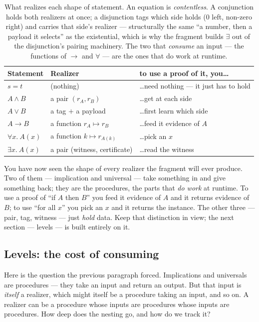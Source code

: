 \documentclass[11pt]{article}
\begin{document}
\begin{table}[h]
\centering
\renewcommand{\arraystretch}{1.35}
\begin{tabular}{@{}l l l@{}}
\toprule
\textbf{Statement} & \textbf{Realizer} & \textbf{to use a proof of it, you\dots} \\
\midrule
$s = t$ & (nothing) & \dots{}need nothing --- it just has to hold \\
$A \land B$ & a pair $(r_A, r_B)$ & \dots{}get at each side \\
$A \lor B$ & a tag $+$ a payload & \dots{}first learn which side \\
$A \rightarrow B$ & a function $r_A \mapsto r_B$ & \dots{}feed it evidence of $A$ \\
$\forall x.\ A(x)$ & a function $k \mapsto r_{A(k)}$ & \dots{}pick an $x$ \\
$\exists x.\ A(x)$ & a pair (witness, certificate) & \dots{}read the witness \\
\bottomrule
\end{tabular}
\caption{What realizes each shape of statement. An equation is
\emph{contentless}. A conjunction holds both realizers at once; a disjunction
tags which side holds ($0$ left, non-zero right) and carries that side's
realizer --- structurally the same ``a number, then a payload it selects''
as the existential, which is why the fragment builds $\exists$ out of the
disjunction's pairing machinery. The two that \emph{consume} an input --- the
functions of $\rightarrow$ and $\forall$ --- are the ones that do work at
runtime.}
\label{tab:realizers}
\end{table}

You have now seen the shape of every realizer the fragment will ever produce.
Two of them --- implication and universal --- take something in and give
something back; they are the procedures, the parts that \emph{do work} at
runtime. To use a proof of ``if $A$ then $B$'' you feed it evidence of $A$
and it returns evidence of $B$; to use ``for all $x$'' you pick an $x$ and it
returns the instance. The other three --- pair, tag, witness --- just
\emph{hold} data. Keep that distinction in view; the next section --- levels
--- is built entirely on it.

\subsection*{Levels: the cost of consuming}

Here is the question the previous paragraph forced. Implications and
universals are procedures --- they take an input and return an output. But
that input is \emph{itself} a realizer, which might itself be a procedure
taking an input, and so on. A realizer can be a procedure whose inputs are
procedures whose inputs are procedures. How deep does the nesting go, and how
do we track it?
\end{document}
